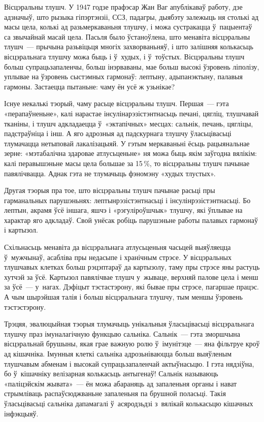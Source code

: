 Вісцэральны тлушч. У 1947 годзе прафэсар Жан Ваг апублікаваў работу, дзе адзначыў, што рызыка гіпэртэнзіі, ССЗ, падагры, дыябэту залежыць ня столькі ад масы цела, колькі ад разьмеркаваньня тлушчу, і можа сустракацца ў~пацыентаў са звычайнай масай цела. Пасьля было ўстаноўлена, што менавіта вісцэральны тлушч~--- прычына разьвіцьця многіх захворваньняў, і што залішняя колькасьць вісцэральнага тлушчу можа быць і ў~худых, і ў~тоўстых. Вісцэральны тлушч больш супрацьзапаленчы, больш інэрваваны, мае больш высокі ўзровень ліполізу, уплывае на ўзровень сыстэмных гармонаў: лептыну, адыпанэктыну, палавыя гармоны. Застаецца пытаньне: чаму ён усё ж узьнікае?

Існуе некалькі тэорый, чаму расьце вісцэральны тлушч. Першая~--- гэта «перапаўненьне», калі нарастае інсулінарэзістэнтнасьць печані, цягліц, тлушчавай тканіны, і тлушч адкладаецца ў~«эктапічных» месцах: сальнік, печань, цягліцы, падстраўніца і інш. А яго адрозныя ад падскурнага тлушчу ўласьцівасьці тлумачацца нетыповай лакалізацыяй. У гэтым меркаваньні ёсьць рацыянальнае зерне: «мэтабалічна здаровае атлусьценьне» ня можа быць якім заўгодна вялікім: калі перавышэньне масы цела большае за 15\,\%, то вісцэральны тлушч пачынае павялічвацца. Аднак гэта не тлумачыць фэномэну «худых тлустых».

Другая тэорыя пра тое, што вісцэральны тлушч пачынае расьці пры гарманальных парушэньнях: лептынрэзістэнтнасьці і інсулінрэзістэнтнасьці. Бо лептын, акрамя ўсё іншага, яшчэ і «рэгуліроўшчык» тлушчу, які ўплывае на характар яго адкладаў. Свой унёсак робіць парушэньне работы палавых гармонаў і картызол.

Схільнасьць менавіта да вісцэральнага атлусьценьня часьцей выяўляецца ў~мужчынаў, асабліва пры недасыпе і хранічным стрэсе. У вісцэральных тлушчавых клетках больш рэцэптараў да картызолу, таму пры стрэсе яны растуць хутчэй за ўсё. Картызол павялічвае тлушч у~жываце, верхняй палове цела і менш за ўсё~--- у~нагах. Дэфіцыт тэстастэрону, які бывае пры стрэсе, пагаршае працэс. А чым шырэйшая талія і больш вісцэральнага тлушчу, тым меншы ўзровень тэстэстэрону.

Трэцяя, эвалюцыйная тэорыя тлумачыць унікальныя ўласьцівасьці вісцэральнага тлушчу праз імуналагічную функцыю сальніка. Сальнік~--- гэта зморшчына вісцэральнай брушыны, якая грае важную ролю ў~імунітэце~--- яна фільтруе кроў ад кішачніка. Імунныя клеткі сальніка адрозьніваюцца больш выяўленым тлушчавым абменам і высокай супрацьзапаленчай актыўнасьцю. І гэта нядзіўна, бо ў~кішачніку велізарная колькасьць антыгенаў! Сальнік называюць «паліцэйскім жывата»~--- ён можа абараняць ад запаленьня органы і нават стрымліваць распаўсюджваньне запаленьня па брушной поласьці. Такія ўласьцівасьці сальніка дапамагалі ў~асяродзьдзі з~вялікай колькасьцю кішачных інфэкцыяў.

